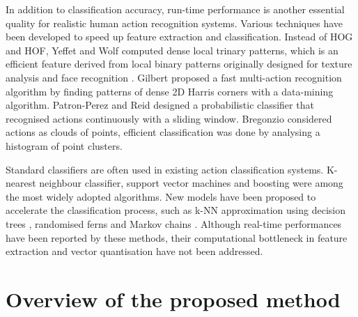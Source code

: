 In addition to classification accuracy, run-time performance is another essential quality for realistic human action recognition systems. Various techniques have been developed to speed up feature extraction and classification. 
Instead of HOG and HOF, Yeffet and Wolf \cite{Yeffet2009} computed dense local trinary patterns, which is an efficient feature derived from local binary patterns originally designed for texture analysis and face recognition \cite{Ahonen2006}. 
Gilbert \etal \cite{Gilbert2009} proposed a fast multi-action recognition algorithm by finding patterns of dense 2D Harris corners with a data-mining algorithm.
Patron-Perez and Reid \cite{Patron2007} designed a probabilistic classifier that recognised actions continuously with a sliding window. 
Bregonzio \etal \cite{Bregonzio2009} considered actions as clouds of points, efficient classification was done by analysing a histogram of point clusters. 

Standard classifiers are often used in existing action classification systems. 
K-nearest neighbour classifier, support vector machines and boosting were among the most widely adopted algorithms. New models have been proposed to accelerate the classification process, such as k-NN approximation using decision trees \cite{Lin2009}, randomised ferns \cite{Oshin2009} and Markov chains \cite{Messing2009}.   
Although real-time performances have been reported by these methods, their computational bottleneck in feature extraction and vector quantisation have not been addressed. 

\section{Overview of the proposed method} 
\label{sec/act/overview}


